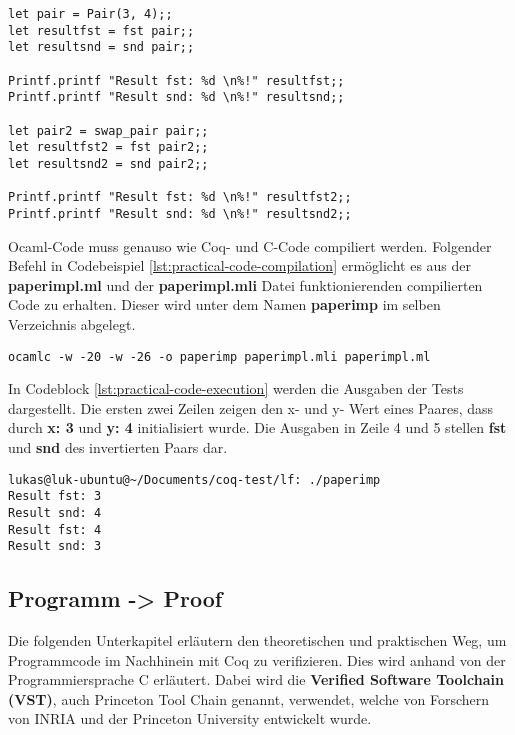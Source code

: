 \begin{lstlisting}[language=coq,firstnumber=1,caption=Ocaml Code testen (paperimpl.ml),label=lst:practical-code-adjustment]
let pair = Pair(3, 4);;
let resultfst = fst pair;;
let resultsnd = snd pair;;

Printf.printf "Result fst: %d \n%!" resultfst;;
Printf.printf "Result snd: %d \n%!" resultsnd;;

let pair2 = swap_pair pair;;
let resultfst2 = fst pair2;;
let resultsnd2 = snd pair2;;

Printf.printf "Result fst: %d \n%!" resultfst2;;
Printf.printf "Result snd: %d \n%!" resultsnd2;;
\end{lstlisting}
Ocaml-Code muss genauso wie Coq- und C-Code compiliert werden. Folgender Befehl in Codebeispiel \ref{lst:practical-code-compilation} ermöglicht es aus der \textbf{paperimpl.ml} und der \textbf{paperimpl.mli} Datei funktionierenden compilierten Code zu erhalten. Dieser wird unter dem Namen \textbf{paperimp} im selben Verzeichnis abgelegt.
\\
\begin{lstlisting}[language=coq,firstnumber=1,caption=Ocaml Code compilieren,label=lst:practical-code-compilation]
ocamlc -w -20 -w -26 -o paperimp paperimpl.mli paperimpl.ml
\end{lstlisting}

In Codeblock \ref{lst:practical-code-execution} werden die Ausgaben der Tests dargestellt. Die ersten zwei Zeilen zeigen den x- und y- Wert eines Paares, dass durch \textbf{x: 3} und \textbf{y: 4} initialisiert wurde. Die Ausgaben in Zeile 4 und 5 stellen \textbf{fst} und \textbf{snd} des invertierten Paars dar.
\begin{lstlisting}[language=coq,firstnumber=1,caption=Ocaml Code ausführen,label=lst:practical-code-execution]
lukas@luk-ubuntu@~/Documents/coq-test/lf: ./paperimp
Result fst: 3 
Result snd: 4 
Result fst: 4 
Result snd: 3 
\end{lstlisting}

\subsection{Programm -> Proof}
Die folgenden Unterkapitel erläutern den theoretischen und praktischen Weg, um Programmcode im Nachhinein mit Coq zu verifizieren. Dies wird anhand von der Programmiersprache C erläutert. Dabei wird die \textbf{Verified Software Toolchain (VST)}, auch Princeton Tool Chain genannt, verwendet, welche von Forschern von INRIA und der Princeton University entwickelt wurde.

